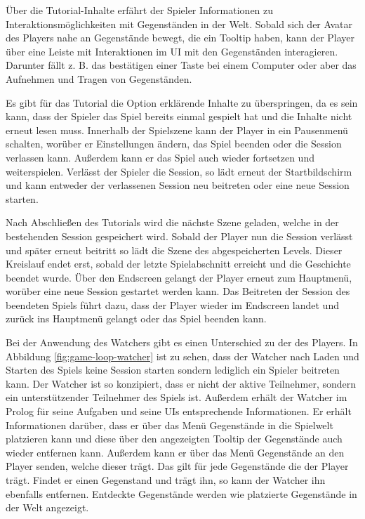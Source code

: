 Über die Tutorial-Inhalte erfährt der Spieler Informationen zu Interaktionsmöglichkeiten mit Gegenständen in der Welt. Sobald sich der Avatar des Players nahe an Gegenstände bewegt, die ein Tooltip haben, kann der Player über eine Leiste mit Interaktionen im UI mit den Gegenständen interagieren. Darunter fällt z. B. das bestätigen einer Taste bei einem Computer oder aber das Aufnehmen und Tragen von Gegenständen.

Es gibt für das Tutorial die Option erklärende Inhalte zu überspringen, da es sein kann, dass der Spieler das Spiel bereits einmal gespielt hat und die Inhalte nicht erneut lesen muss. Innerhalb der Spielszene kann der Player in ein Pausenmenü schalten, worüber er Einstellungen ändern, das Spiel beenden oder die Session verlassen kann. Außerdem kann er das Spiel auch wieder fortsetzen und weiterspielen. Verlässt der Spieler die Session, so lädt erneut der Startbildschirm und kann entweder der verlassenen Session neu beitreten oder eine neue Session starten.

Nach Abschließen des Tutorials wird die nächste Szene geladen, welche in der bestehenden Session gespeichert wird. Sobald der Player nun die Session verlässt und später erneut beitritt so lädt die Szene des abgespeicherten Levels. Dieser Kreislauf endet erst, sobald der letzte Spielabschnitt erreicht und die Geschichte beendet wurde. Über den Endscreen gelangt der Player erneut zum Hauptmenü, worüber eine neue Session gestartet werden kann. Das Beitreten der Session des beendeten Spiels führt dazu, dass der Player wieder im Endscreen landet und zurück ins Hauptmenü gelangt oder das Spiel beenden kann.

Bei der Anwendung des Watchers gibt es einen Unterschied zu der des Players. In Abbildung \ref{fig:game-loop-watcher} ist zu sehen, dass der Watcher nach Laden und Starten des Spiels keine Session starten sondern lediglich ein Spieler beitreten kann. Der Watcher ist so konzipiert, dass er nicht der aktive Teilnehmer, sondern ein unterstützender Teilnehmer des Spiels ist. Außerdem erhält der Watcher im Prolog für seine Aufgaben und seine \ac{UI}s entsprechende Informationen. Er erhält Informationen darüber, dass er über das Menü  Gegenstände in die Spielwelt platzieren kann und diese über den angezeigten Tooltip der Gegenstände auch wieder entfernen kann. Außerdem kann er über das Menü  Gegenstände an den Player senden, welche dieser trägt. Das gilt für jede Gegenstände die der Player trägt. Findet er einen Gegenstand und trägt ihn, so kann der Watcher ihn ebenfalls entfernen. Entdeckte Gegenstände werden wie platzierte Gegenstände in der Welt angezeigt.

